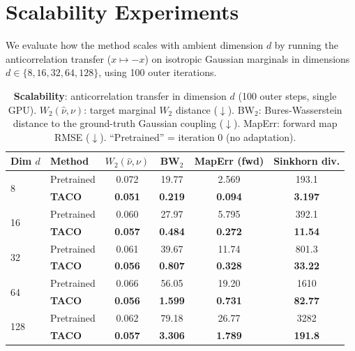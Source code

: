 \documentclass[11pt]{article}
\theoremstyle{definition}
\numberwithin{equation}{section}%
\begin{document}

% 
\section{Scalability Experiments}
\label{app:scalability}
% 

We evaluate how the method scales with ambient dimension $d$ by running the
anticorrelation transfer ($x\mapsto -x$) on isotropic Gaussian marginals in
dimensions $d\in\{8, 16, 32, 64, 128\}$, using 100 outer iterations.

\begin{table}[ht]
\centering
\caption{\textbf{Scalability}: anticorrelation transfer in dimension $d$
  (100 outer steps, single GPU).
  $W_2(\hat\nu,\nu)$: target marginal $W_2$ distance ($\downarrow$).
  BW$_2$: Bures-Wasserstein distance to the ground-truth Gaussian coupling ($\downarrow$).
  MapErr: forward map RMSE ($\downarrow$).
  ``Pretrained'' = iteration 0 (no adaptation).}
\label{tab:scalability}
\vspace{2pt}
\setlength{\tabcolsep}{8pt}
\begin{tabular}{llcccc}
\toprule
Dim $d$ & Method & $W_2(\hat\nu,\nu)$ & BW$_2$ & MapErr (fwd) & Sinkhorn div. \\
\midrule
\multirow{2}{*}{8}
  & Pretrained & 0.072 & 19.77 & 2.569 & 193.1 \\
  & \textbf{TACO} & \textbf{0.051} & \textbf{0.219} & \textbf{0.094} & \textbf{3.197} \\
\multirow{2}{*}{16}
  & Pretrained & 0.060 & 27.97 & 5.795 & 392.1 \\
  & \textbf{TACO} & \textbf{0.057} & \textbf{0.484} & \textbf{0.272} & \textbf{11.54} \\
\multirow{2}{*}{32}
  & Pretrained & 0.061 & 39.67 & 11.74 & 801.3 \\
  & \textbf{TACO} & \textbf{0.056} & \textbf{0.807} & \textbf{0.328} & \textbf{33.22} \\
\multirow{2}{*}{64}
  & Pretrained & 0.066 & 56.05 & 19.20 & 1610  \\
  & \textbf{TACO} & \textbf{0.056} & \textbf{1.599} & \textbf{0.731} & \textbf{82.77} \\
\multirow{2}{*}{128}
  & Pretrained & 0.062 & 79.18 & 26.77 & 3282  \\
  & \textbf{TACO} & \textbf{0.057} & \textbf{3.306} & \textbf{1.789} & \textbf{191.8} \\
\bottomrule
\end{tabular}
\end{table}
\end{document}
